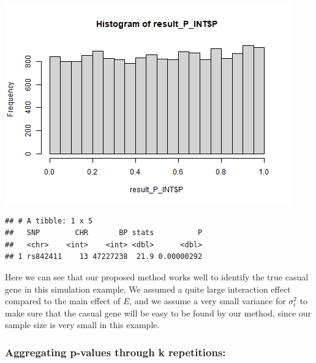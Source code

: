 \documentclass[
]{article}
\newenvironment{Shaded}{\begin{snugshade}}{\end{snugshade}}
\newcommand{\DataTypeTok}[1]{\textcolor[rgb]{0.13,0.29,0.53}{#1}}
\newcommand{\DecValTok}[1]{\textcolor[rgb]{0.00,0.00,0.81}{#1}}
\newcommand{\KeywordTok}[1]{\textcolor[rgb]{0.13,0.29,0.53}{\textbf{#1}}}
\newcommand{\NormalTok}[1]{#1}
\newcommand{\OperatorTok}[1]{\textcolor[rgb]{0.81,0.36,0.00}{\textbf{#1}}}
\newcommand{\StringTok}[1]{\textcolor[rgb]{0.31,0.60,0.02}{#1}}
\begin{document}
\begin{Shaded}
\end{Shaded}

\includegraphics{stats-gene-research-progress-v8_files/figure-latex/OneCasualGene-3.png}

\begin{Shaded}
\end{Shaded}

\begin{verbatim}
## # A tibble: 1 x 5
##   SNP        CHR       BP stats          P
##   <chr>    <int>    <int> <dbl>      <dbl>
## 1 rs842411    13 47227238  21.9 0.00000292
\end{verbatim}

Here we can see that our proposed method works well to identify the true
casual gene in this simulation example. We assumed a quite large
interaction effect compared to the main effect of \(E\), and we assume a
very small variance for \(\sigma_\epsilon^2\) to make sure that the
casual gene will be easy to be found by our method, since our sample
size is very small in this example.

\clearpage

\hypertarget{aggregating-p-values-through-k-repetitions}{%
\subsubsection{Aggregating p-values through k
repetitions:}\label{aggregating-p-values-through-k-repetitions}}
\end{document}
